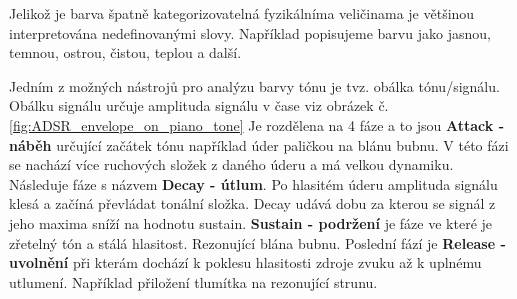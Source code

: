   Jelikož je barva špatně kategorizovatelná fyzikálníma veličinama je většinou interpretována nedefinovanými slovy.
  Například popisujeme barvu jako jasnou, temnou, ostrou, čistou, teplou a další.

  Jedním z možných nástrojů pro analýzu barvy tónu je tvz. obálka tónu/signálu.
  Obálku signálu určuje amplituda signálu v čase viz obrázek č. \ref*{fig:ADSR_envelope_on_piano_tone}
  Je rozdělena na 4 fáze a to jsou \textbf{Attack - náběh} určující začátek tónu například úder paličkou na blánu bubnu.
  V této fázi se nachází více ruchových složek z daného úderu a má velkou dynamiku.
  Následuje fáze s názvem \textbf{Decay - útlum}.
  Po hlasitém úderu amplituda signálu klesá a začíná převládat tonální složka. Decay udává dobu za kterou se signál z jeho maxima sníží na hodnotu sustain.
  \textbf{Sustain - podržení} je fáze ve které je zřetelný tón a stálá hlasitost. Rezonující blána bubnu.
  Poslední fází je \textbf{Release - uvolnění} při kterám dochází k poklesu hlasitosti zdroje zvuku až k uplnému utlumení.
  Například přiložení tlumítka na rezonující strunu.

